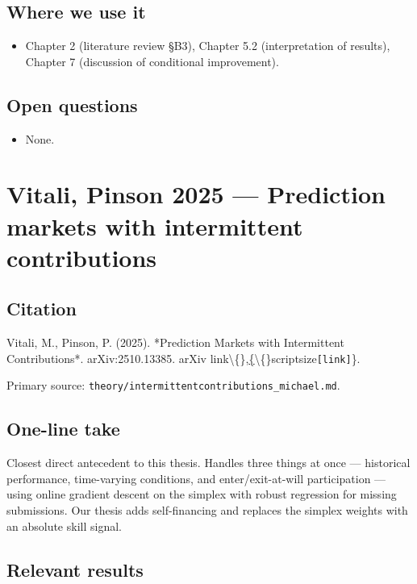 \documentclass[11pt,a4paper,openany]{report}
\begin{document}
\section{Where we use it}

\begin{itemize}
  \item Chapter 2 (literature review §B3), Chapter 5.2 (interpretation of
    results), Chapter 7 (discussion of conditional improvement).
\end{itemize}

\section{Open questions}

\begin{itemize}
  \item None.
\end{itemize}

\chapter{Vitali, Pinson 2025 — Prediction markets with intermittent contributions}

\section{Citation}

Vitali, M., Pinson, P. (2025). *Prediction Markets with Intermittent
Contributions*. arXiv:2510.13385.
arXiv link\textbackslash\{\},\href{https://arxiv.org/abs/2510.13385}\{\textbackslash\{\}scriptsize\texttt{[link]}\}.

Primary source: \texttt{theory/intermittentcontributions\_michael.md}.

\section{One-line take}

Closest direct antecedent to this thesis. Handles three things at once
— historical performance, time-varying conditions, and
enter/exit-at-will participation — using online gradient descent on the
simplex with robust regression for missing submissions. Our thesis
adds self-financing and replaces the simplex weights with an absolute
skill signal.

\section{Relevant results}
\end{document}
